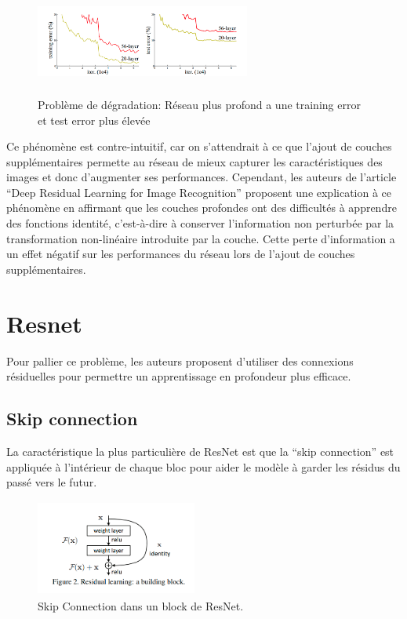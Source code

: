 \documentclass{article}
\begin{document}
\begin{figure}[h]
    \centering
    \includegraphics[width=200pt,height=100pt]{./img/degradation}
    \caption{Problème de dégradation: Réseau plus profond a une training error et test error  plus élevée}\label{fig: degrad}
\end{figure}
Ce phénomène est contre-intuitif, car on s'attendrait à ce que l'ajout de couches supplémentaires permette au réseau de mieux
capturer les caractéristiques des images et donc d'augmenter ses performances.
Cependant, les auteurs de l'article ``Deep Residual Learning for Image Recognition'' proposent une explication à ce phénomène
en affirmant que les couches profondes ont des difficultés à apprendre des fonctions identité,
c'est-à-dire à conserver l'information non perturbée par la transformation non-linéaire introduite par la couche.
Cette perte d'information a un effet négatif sur les performances du réseau lors de l'ajout de couches supplémentaires.

\section{Resnet}

Pour pallier ce problème, les auteurs proposent d'utiliser des connexions résiduelles pour permettre un apprentissage en
profondeur plus efficace.

\subsection{Skip connection}
La caractéristique la plus particulière de ResNet est que la ``skip connection'' est appliquée à l'intérieur de chaque bloc
pour aider le modèle à garder les résidus du passé vers le futur.

\begin{figure}[h]
    \centering
    \includegraphics[width=150pt,height=90pt]{./img/skip}
    \caption{Skip Connection dans un block de ResNet.}\label{fig: skip}
\end{figure}
\end{document}
